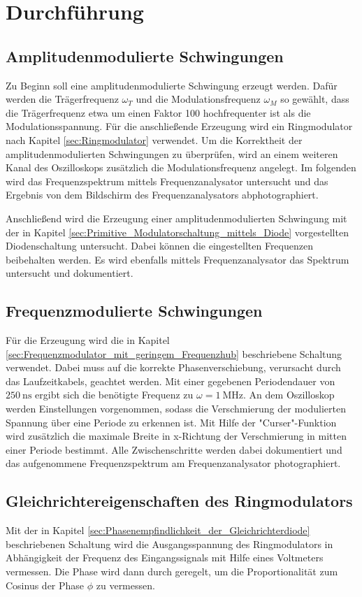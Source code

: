 \section{Durchführung}
\label{sec:Durchführung}

\subsection{Amplitudenmodulierte Schwingungen}
Zu Beginn soll eine amplitudenmodulierte Schwingung erzeugt werden. Dafür werden die Trägerfrequenz $\omega_T$ und die Modulationsfrequenz $\omega_M$ so gewählt, dass die Trägerfrequenz etwa um einen Faktor 100 hochfrequenter ist als die Modulationsspannung. Für die anschließende Erzeugung wird ein Ringmodulator nach Kapitel \ref{sec:Ringmodulator} verwendet. Um die Korrektheit der amplitudenmodulierten Schwingungen zu überprüfen, wird an einem weiteren Kanal des Oszilloskops zusätzlich die Modulationsfrequenz angelegt. Im folgenden wird das Frequenzspektrum mittels Frequenzanalysator untersucht und das Ergebnis von dem Bildschirm des Frequenzanalysators abphotographiert.

Anschließend wird die Erzeugung einer amplitudenmodulierten Schwingung mit der in Kapitel \ref{sec:Primitive_Modulatorschaltung_mittels_Diode} vorgestellten Diodenschaltung untersucht. Dabei können die eingestellten Frequenzen beibehalten werden. Es wird ebenfalls mittels Frequenzanalysator das Spektrum untersucht und dokumentiert.

\subsection{Frequenzmodulierte Schwingungen}
Für die Erzeugung wird die in Kapitel \ref{sec:Frequenzmodulator_mit_geringem_Frequenzhub} beschriebene Schaltung verwendet. Dabei muss auf die korrekte Phasenverschiebung, verursacht durch das Laufzeitkabels, geachtet werden. Mit einer gegebenen Periodendauer von $\SI{250}{\ns}$ ergibt sich die benötigte Frequenz zu $\omega=\SI{1}{\mega\hertz}$. An dem Oszilloskop werden Einstellungen vorgenommen, sodass die Verschmierung der modulierten Spannung über eine Periode zu erkennen ist. Mit Hilfe der "Curser"-Funktion wird zusätzlich die maximale Breite in x-Richtung der Verschmierung in mitten einer Periode bestimmt. Alle Zwischenschritte werden dabei dokumentiert und das aufgenommene Frequenzspektrum am Frequenzanalysator photographiert.

\subsection{Gleichrichtereigenschaften des Ringmodulators}
Mit der in Kapitel \ref{sec:Phasenempfindlichkeit_der_Gleichrichterdiode} beschriebenen Schaltung wird die Ausgangsspannung des Ringmodulators in Abhängigkeit der Frequenz des Eingangssignals mit Hilfe eines Voltmeters vermessen. Die Phase wird dann durch geregelt, um die Proportionalität zum Cosinus der Phase $\phi$ zu vermessen.

